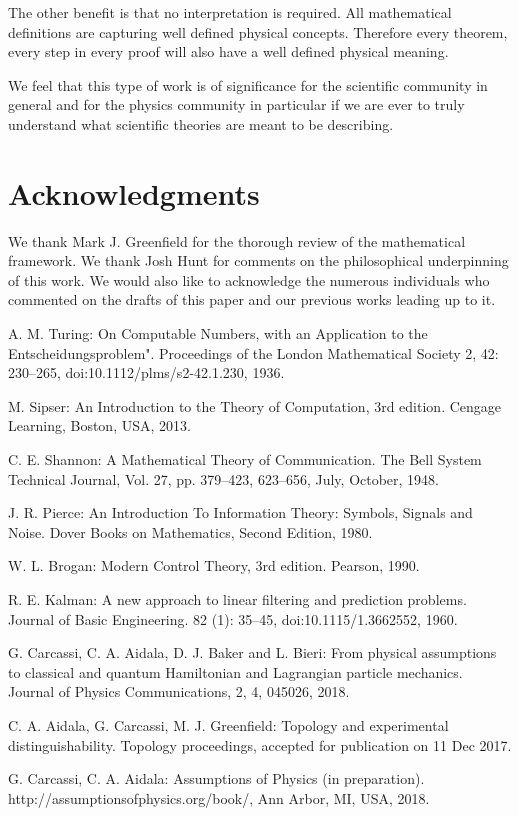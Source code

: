 \documentclass[letterpaper]{article}
\theoremstyle{plain}%
\theoremstyle{definition}
\theoremstyle{remark}
\numberwithin{equation}{section}
\begin{document}
The other benefit is that no interpretation is required. All mathematical definitions are capturing well defined physical concepts. Therefore every theorem, every step in every proof will also have a well defined physical meaning.

We feel that this type of work is of significance for the scientific community in general and for the physics community in particular if we are ever to truly understand what scientific theories are meant to be describing.

\section{Acknowledgments}

We thank Mark J. Greenfield for the thorough review of the mathematical framework. We thank Josh Hunt for comments on the philosophical underpinning of this work. We would also like to acknowledge the numerous individuals who commented on the drafts of this paper and our previous works leading up to it.



\begin{thebibliography}{1}
	
	A. M. Turing: On Computable Numbers, with an Application to the Entscheidungsproblem". Proceedings of the London Mathematical Society 2, 42: 230–265, doi:10.1112/plms/s2-42.1.230, 1936. 
	
	 M. Sipser: An Introduction to the Theory of Computation, 3rd edition. Cengage Learning, Boston, USA, 2013.
	
	 C. E. Shannon: A Mathematical Theory of Communication. The Bell System Technical Journal,
	Vol. 27, pp. 379–423, 623–656, July, October, 1948.
	
	 J. R. Pierce: An Introduction To Information Theory: Symbols, Signals and Noise. Dover Books on Mathematics, Second Edition, 1980.
	
	 W. L. Brogan: Modern Control Theory, 3rd edition. Pearson, 1990. 	
	
	 R. E. Kalman: A new approach to linear filtering and prediction problems. Journal of Basic Engineering. 82 (1): 35–45, doi:10.1115/1.3662552, 1960.
	
	 G. Carcassi, C. A. Aidala, D. J. Baker and L. Bieri: From physical assumptions to classical and quantum Hamiltonian and Lagrangian particle mechanics. Journal of Physics Communications, 2, 4, 045026, 2018.
	
	 C. A. Aidala, G. Carcassi, M. J. Greenfield: Topology and experimental distinguishability. Topology proceedings, accepted for publication on 11 Dec 2017.
	
	 G. Carcassi, C. A. Aidala: Assumptions of Physics (in preparation). http://assumptionsofphysics.org/book/, Ann Arbor, MI, USA, 2018.
\end{thebibliography}
\end{document}
